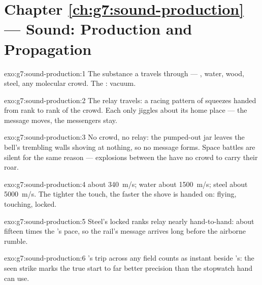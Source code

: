 \section*{Chapter \ref{ch:g7:sound-production} --- Sound: Production and Propagation}

\begin{solution}{exo:g7:sound-production:1}
The substance a  travels through --- , water, wood,
steel, any molecular crowd. The : vacuum.
\end{solution}

\begin{solution}{exo:g7:sound-production:2}
The relay travels: a racing pattern of squeezes handed from rank
to rank of the crowd. Each  only jiggles about its home
place --- the message moves, the messengers stay.
\end{solution}

\begin{solution}{exo:g7:sound-production:3}
No crowd, no relay: the pumped-out jar leaves the bell's
trembling walls shoving at nothing, so no message forms. Space
battles are silent for the same reason --- explosions between the
 have no crowd to carry their roar.
\end{solution}

\begin{solution}{exo:g7:sound-production:4}
 about \qty{340}{m/s}; water about \qty{1500}{m/s}; steel
about \qty{5000}{m/s}. The tighter the  touch, the
faster the shove is handed on: flying, touching, locked.
\end{solution}

\begin{solution}{exo:g7:sound-production:5}
Steel's locked ranks relay nearly hand-to-hand: about fifteen
times the 's pace, so the rail's message arrives long before
the airborne rumble.
\end{solution}

\begin{solution}{exo:g7:sound-production:6}
's trip across any field counts as instant beside 's:
the seen strike marks the true start to far better precision than
the stopwatch hand can use.
\end{solution}

